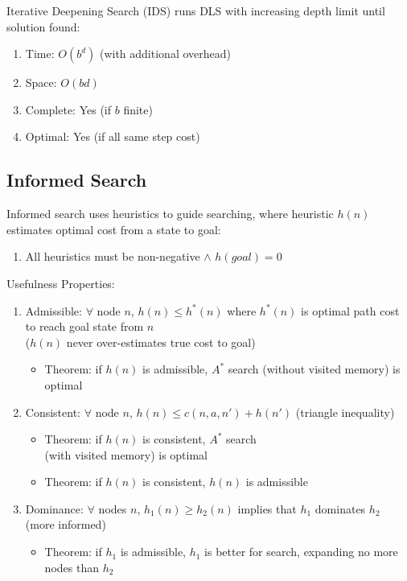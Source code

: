 \documentclass[12pt, a4paper]{article}
\begin{document}
\begin{multicols*}{3}
Iterative Deepening Search (IDS) runs DLS with increasing depth limit until solution found:
\begin{enumerate}[\roman*.]
  \item Time: $O(b^d)$ (with additional overhead)
  \item Space: $O(bd)$
  \item Complete: Yes (if $b$ finite)
  \item Optimal: Yes (if all same step cost)
\end{enumerate}
\colbreak
\subsection{Informed Search}
Informed search uses heuristics to guide searching, where heuristic $h(n)$ estimates optimal cost from a state to goal:
\begin{enumerate}[\roman*.]
  \item All heuristics must be non-negative $\land$ $h(goal) = 0$
\end{enumerate}

Usefulness Properties:
\begin{enumerate}[\roman*.]
  \item Admissible: $\forall$  node $n$, $h(n) \leq h^*(n)$ where $h^*(n)$ is optimal path cost to reach goal state from $n$\\ ($h(n)$ never over-estimates true cost to goal)
    \begin{itemize}[leftmargin=*]\vspace{3pt}
      \item Theorem: if $h(n)$ is admissible, $A^*$ search (without visited memory) is optimal
    \end{itemize}
  \item Consistent: $\forall$ node $n$, $h(n) \leq c(n,a,n') + h(n')$ (triangle inequality)
    \begin{itemize}[leftmargin=*]\vspace{3pt}
      \item Theorem: if $h(n)$ is consistent, $A^*$ search\\(with visited memory) is optimal
      \item Theorem: if $h(n)$ is consistent, $h(n)$ is admissible
    \end{itemize}
  \item Dominance: $\forall$ nodes $n$, $h_1(n) \geq h_2(n)$ implies that $h_1$ dominates $h_2$ (more informed) 
    \begin{itemize}[leftmargin=*]\vspace{3pt}
      \item Theorem: if $h_1$ is admissible, $h_1$ is better for search, expanding no more nodes than $h_2$
    \end{itemize}
\end{enumerate}


\end{multicols*}
\end{document}
